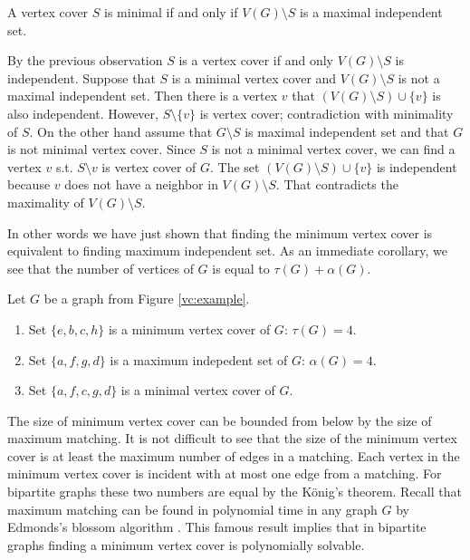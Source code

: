 \begin{obs}
	A vertex cover \(S\) is minimal if and only if \(V(G) \setminus S\) is a maximal independent set.
\end{obs}
\begin{myproof}
	By the previous observation \(S\) is a vertex cover if and only \(V(G) \setminus S\) is independent.
	Suppose that \(S\) is a minimal vertex cover and \(V(G) \setminus S\) is not a maximal independent set.
	Then there is a vertex \(v\) that \((V(G) \setminus S) \cup \{v\}\) is also independent.
	However, \(S \setminus \{v\}\) is vertex cover; contradiction with minimality of \(S\).
	On the other hand assume that \(G \setminus S\) is maximal independent set and that 
	\(G\) is not minimal vertex cover. 
	Since \(S\) is not a minimal vertex cover, we can find a vertex \(v\) s.t. \(S \setminus {v}\)
	is vertex cover of \(G\). The set \((V(G) \setminus S) \cup \{v\}\) is independent
	because \(v\) does not have a neighbor in \(V(G) \setminus S\). 
	That contradicts the maximality of \(V(G) \setminus S\).
\end{myproof}
In other words we have just shown that finding the minimum vertex cover is equivalent to finding maximum independent set.
As an immediate corollary, we see that the number of vertices of \(G\) is equal to \(\tau(G) + \alpha(G)\).

\begin{figure}[h]
\centering

\caption{}
\end{figure}
\label{vc:example}

\begin{example}\label{ex1}
	Let \(G\) be a graph from Figure \ref{vc:example}.
\begin{enumerate}
	\item Set \(\{e, b, c, h\}\) is a minimum vertex cover of \(G\): \(\tau(G) = 4\).
	\item Set \(\{a, f, g, d\}\) is a maximum indepedent set of \(G\): \(\alpha(G)=4\).
	\item Set \(\{a, f, c, g, d\}\) is a minimal vertex cover of \(G\).
\end{enumerate}
\end{example}

The size of minimum vertex cover can be bounded from below by the size of maximum matching.
It is not difficult to see that the size of the minimum vertex cover is at least the maximum number of edges in a matching.
Each vertex in the minimum vertex cover is incident with at most one edge from a matching.
For bipartite graphs these two numbers are equal by the K\"onig's theorem.
Recall that maximum matching can be found in polynomial time in any graph \(G\) by Edmonds's blossom algorithm \cite{Edmonds65}.
This famous result implies that in bipartite graphs finding a minimum vertex cover is polynomially solvable.

